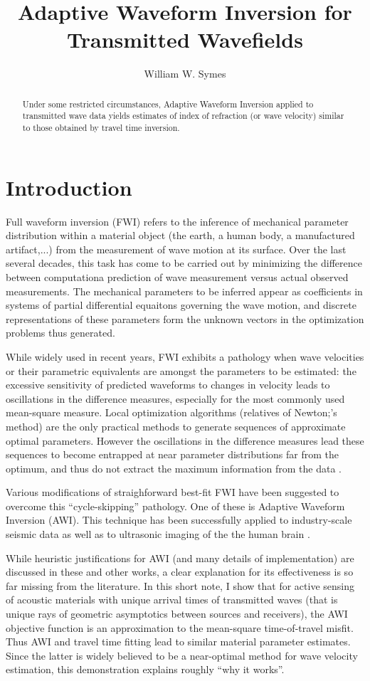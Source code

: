 \title{Adaptive Waveform Inversion for Transmitted Wavefields}
\author{William W. Symes}

\begin{abstract}
Under some restricted circumstances, Adaptive Waveform Inversion
applied to transmitted wave data yields estimates of index of
refraction (or wave velocity) similar to those obtained by travel time inversion.
\end{abstract}

\section{Introduction}
Full waveform inversion (FWI) refers to the inference of mechanical
parameter distribution within a material object  (the earth, a human
body, a manufactured artifact,...) from the measurement of wave motion
at its surface. Over the last several decades, this task has come to
be carried out by minimizing the difference between computationa
prediction of wave measurement versus actual observed
measurements. The mechanical parameters to be inferred appear as
coefficients in systems of partial differential equaitons governing
the wave motion, and discrete representations of these parameters form
the unknown vectors in the optimization problems thus generated.

While widely used in recent years, FWI exhibits a pathology when wave
velocities or their parametric equivalents are amongst the parameters
to be estimated: the excessive sensitivity of predicted waveforms to
changes in velocity leads to oscillations in the difference measures,
especially for the most commonly used mean-square measure. Local
optimization algorithms (relatives of Newton;'s method) are the only practical
methods to generate sequences of approximate optimal
parameters. However the oscillations in the difference measures lead
these sequences to become entrapped at near parameter distributions
far from the optimum, and thus do not extract the maximum information
from the data \cite[]{VirieuxOperto:09}. 

Various modifications of straighforward best-fit FWI have been
suggested to overcome this ``cycle-skipping'' pathology. One of these
is Adaptive Waveform Inversion \cite[]{Warner:16} (AWI). This
technique has been successfully applied to industry-scale seismic data
\cite[]{GuaschWarnerRavaut:GEO19,Warneretal:SEG21} as well as to
ultrasonic imaging of the the human brain
\cite[]{Guaschetal:NPJDM20}.

While heuristic justifications for AWI (and
many details of implementation) are discussed in these and other
works, a clear explanation for its effectiveness is 
so far missing from the literature. In this short note, I show that
for active sensing of acoustic materials with unique arrival times of
transmitted waves
(that is unique rays of geometric asymptotics between sources and
receivers), the AWI objective function is an approximation to the
mean-square time-of-travel misfit. Thus AWI and travel time fitting
lead to similar material parameter estimates. Since the latter is
widely believed to be a near-optimal method for wave velocity
estimation, this demonstration explains roughly ``why it works''.


